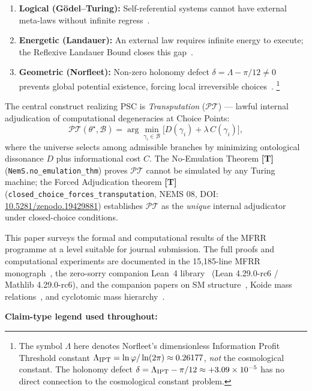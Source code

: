 \documentclass[11pt]{article}
\newcommand{\PT}{\mathcal{P}\mathcal{T}}
\newcommand{\tagT}{\textbf{[T]}}
\theoremstyle{plain}
\theoremstyle{definition}
\theoremstyle{remark}
\begin{document}
\begin{enumerate}[nosep]
\item \textbf{Logical (G\"odel--Turing):} Self-referential systems cannot have external meta-laws without infinite regress~\cite{Goedel1931,Turing1936}.
\item \textbf{Energetic (Landauer):} An external law requires infinite energy to execute; the Reflexive Landauer Bound closes this gap~\cite{Landauer1961}.
  \item \textbf{Geometric (Norfleet):} Non-zero holonomy defect $\delta = \Lambda - \pi/12 \neq 0$ prevents global potential existence, forcing local irreversible choices~\cite{NorfleetPrivComm}.%
  \footnote{The symbol $\Lambda$ here denotes Norfleet's dimensionless
    Information Profit Threshold constant $\Lambda_{\rm IPT} = \ln\varphi/\ln(2\pi)
    \approx 0.26177$, \emph{not} the cosmological constant.  The holonomy defect
    $\delta = \Lambda_{\rm IPT} - \pi/12 \approx +3.09\times10^{-5}$ has no direct
    connection to the cosmological constant problem.}
\end{enumerate}

The central construct realizing PSC is \emph{Transputation} ($\PT$) ---
lawful internal adjudication of computational degeneracies at Choice Points:
\[
\PT(\theta^\star, \mathcal{B}) =
\arg\min_{\gamma_i \in \mathcal{B}} \bigl[ D(\gamma_i) + \lambda\, C(\gamma_i) \bigr],
\]
where the universe selects among admissible branches by minimizing ontological dissonance $D$
plus informational cost $C$.
The No-Emulation Theorem \tagT{} (\texttt{NemS.no\_emulation\_thm}) proves $\PT$ cannot
be simulated by any Turing machine; the Forced Adjudication theorem \tagT{}
(\texttt{closed\_choice\_forces\_transputation}, NEMS 08, DOI: \href{https://doi.org/10.5281/zenodo.19429881}{10.5281/zenodo.19429881})
establishes $\PT$ as the \emph{unique} internal adjudicator under closed-choice conditions.

This paper surveys the formal and computational results of the MFRR programme at a level
suitable for journal submission.
The full proofs and computational experiments are documented in the
15,185-line MFRR monograph~\cite{SpivackMFRR}, the zero-sorry companion Lean~4 library~\cite{SpivackUGPFormalization,ugp-lean}
(Lean 4.29.0-rc6 / Mathlib 4.29.0-rc6),
and the companion papers on SM structure~\cite{Spivack2026_SM_UGP},
Koide mass relations~\cite{Spivack2026_Koide},
and cyclotomic mass hierarchy~\cite{Spivack2026_CyclotomicMass}.

\medskip
\noindent\textbf{Claim-type legend used throughout:}
\end{document}
